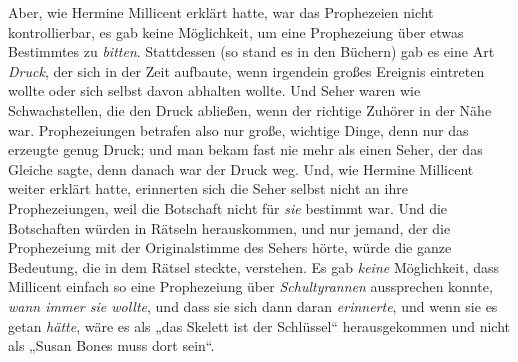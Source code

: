 Aber, wie Hermine Millicent erklärt hatte, war das Prophezeien nicht kontrollierbar, es gab keine Möglichkeit, um eine Prophezeiung über etwas Bestimmtes zu \emph{bitten}. Stattdessen (so stand es in den Büchern) gab es eine Art \emph{Druck}, der sich in der Zeit aufbaute, wenn irgendein großes Ereignis eintreten wollte oder sich selbst davon abhalten wollte. Und Seher waren wie Schwachstellen, die den Druck abließen, wenn der richtige Zuhörer in der Nähe war. Prophezeiungen betrafen also nur große, wichtige Dinge, denn nur das erzeugte genug Druck; und man bekam fast nie mehr als einen Seher, der das Gleiche sagte, denn danach war der Druck weg. Und, wie Hermine Millicent weiter erklärt hatte, erinnerten sich die Seher selbst nicht an ihre Prophezeiungen, weil die Botschaft nicht für \emph{sie} bestimmt war. Und die Botschaften würden in Rätseln herauskommen, und nur jemand, der die Prophezeiung mit der Originalstimme des Sehers hörte, würde die ganze Bedeutung, die in dem Rätsel steckte, verstehen. Es gab \emph{keine} Möglichkeit, dass Millicent einfach so eine Prophezeiung über \emph{Schultyrannen} aussprechen konnte, \emph{wann immer sie wollte}, und dass sie sich dann daran \emph{erinnerte}, und wenn sie es getan \emph{hätte}, wäre es als „das Skelett ist der Schlüssel“ herausgekommen und nicht als „Susan Bones muss dort sein“.

